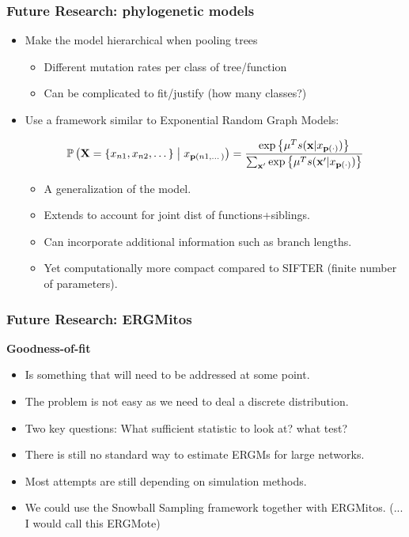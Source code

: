 \documentclass[aspectratio=169, 9pt]{beamer}
\begin{document}
\begin{frame}
\frametitle{Future Research: phylogenetic models}

\begin{itemize}
\item Make the model hierarchical when pooling trees\pause
\begin{itemize}
\item Different mutation rates per class of tree/function
\item Can be complicated to fit/justify (how many classes?)
\end{itemize}\pause
\item Use a framework similar to Exponential Random Graph Models:\pause

$$
\Prcond{\Ann=\{\ann{n1}, \ann{n2},\dots\}}{\ann{\parent{n1, \dots}}} = \frac{\exp{\mu^{T} s(\mathbf{x}|\ann{\parent{\cdot}})}}{\sum_{\mathbf{x}'}\exp{\mu^{T} s(\mathbf{x}'|\ann{\parent{\cdot}})}}
$$

\begin{itemize}
\item A generalization of the model.
\item Extends to account for joint dist of functions+siblings.
\item Can incorporate additional information such as branch lengths.
\item Yet computationally more compact compared to SIFTER (finite number of parameters).
\end{itemize}
\end{itemize}


\end{frame}


\begin{frame}[t]
\frametitle{Future Research: ERGMitos}

{\bf Goodness-of-fit}\pause
\begin{itemize}
\item Is something that will need to be addressed at some point.\pause
\item The problem is not easy as we need to deal a discrete distribution.\pause
\item Two key questions: What sufficient statistic to look at? what test?
\end{itemize}

 \pause
\begin{itemize}
\item There is still no standard way to estimate ERGMs for large networks.\pause
\item Most attempts are still depending on simulation methods.\pause
\item We could use the Snowball Sampling framework together with ERGMitos.\pause{}
(... I would call this ERGMote)
\end{itemize}

\end{frame}
\end{document}
